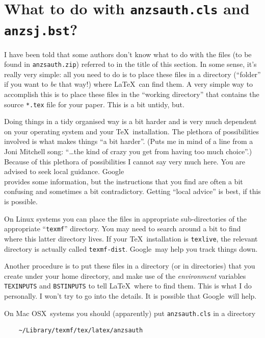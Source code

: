 \documentclass[
  times,
  doublespace]{anzsauth}
\begin{document}
\section{\texorpdfstring{What to do with \texttt{anzsauth.cls} and
\texttt{anzsj.bst}?}{What to do with anzsauth.cls and anzsj.bst?}}\label{sec:wheretoshove}

I have been told that some authors don't know what to do with the files
(to be found in \texttt{anzsauth.zip}) referred to in the title of this
section. In some sense, it's really very simple: all you need to do is
to place these files in a directory (``folder'' if you want to \emph{be}
that way!) where \LaTeX~can find them. A very simple way to accomplish
this is to place these files in the ``working directory'' that contains
the source \texttt{*.tex} file for your paper. This is a bit untidy,
but.

Doing things in a tidy organised way is a bit harder and is very much
dependent on your operating system and your \TeX~installation. The
plethora of possibilities involved is what makes things ``a bit
harder''. (Puts me in mind of a line from a Joni Mitchell song:
``\ldots the kind of crazy you get from having too much choice''.)
Because of this plethora of possibilities I cannot say very much here.
You are advised to seek local guidance. Google\texttrademark\\
provides some information, but the instructions that you find are often
a bit confusing and sometimes a bit contradictory. Getting ``local
advice'' is best, if this is possible.

On Linux systems you can place the files in appropriate sub-directories
of the appropriate ``\texttt{texmf}'' directory. You may need to search
around a bit to find where this latter directory lives. If your
\TeX~installation is \texttt{texlive}, the relevant directory is
actually called \texttt{texmf-dist}. Google\texttrademark~may help you
track things down.

Another procedure is to put these files in a directory (or in
directories) that you create under your home directory, and make use of
the \emph{environment} variables \texttt{TEXINPUTS} and
\texttt{BSTINPUTS} to tell \LaTeX~where to find them. This is what I do
personally. I won't try to go into the details. It is possible that
Google\texttrademark~will help.

On Mac OSX\texttrademark~systems you should (apparently) put
\texttt{anzsauth.cls} in a directory

\begin{verbatim}
    ~/Library/texmf/tex/latex/anzsauth
\end{verbatim}
\end{document}

